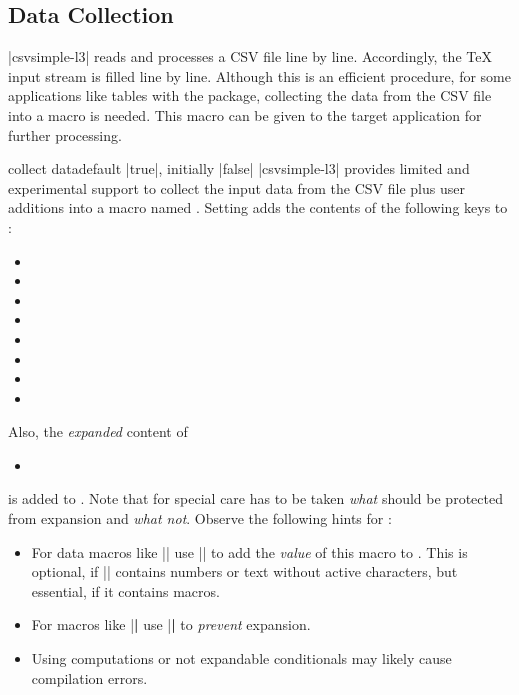 \documentclass[a4paper,11pt]{ltxdoc}
\begin{document}
\clearpage
\subsection{Data Collection}\label{sec:datacollection}

|csvsimple-l3| reads and processes a CSV file line by line. Accordingly, the \TeX{}
input stream is filled line by line.
Although this is an efficient procedure, for some applications like tables with
the  package, collecting the data from the CSV file into a macro is needed.
This macro can be given to the target application for further processing.


\begin{docCsvKey}[][doc new=2021-07-06]{collect data}{}{default |true|, initially |false|}
|csvsimple-l3| provides limited and experimental support to collect the input data
from the CSV file plus user additions into a macro named .
Setting  adds the contents of the following keys
to :
\begin{itemize}
\item{}
\item{}
\item{}
\item{}
\item{}
\item{}
\item{}
\item{}
\end{itemize}
Also, the \emph{expanded} content of
\begin{itemize}
\item{}
\end{itemize}
is added to .
Note that for  special care has to be taken
\emph{what} should be protected from expansion and \emph{what not}.
Observe the following hints for :
\begin{itemize}
\item For data macros like |\csvcoli| use |\csvexpval\csvcoli| to add
  the \emph{value} of this macro to .
  This is optional, if |\csvcoli| contains numbers or text without active
  characters, but essential, if it contains macros.
\item For macros like |\textbf| use  |\csvexpnot\textbf| to \emph{prevent}
  expansion.
\item Using computations or not expandable conditionals may likely cause
  compilation errors.
\end{itemize}


\end{docCsvKey}
\end{document}
